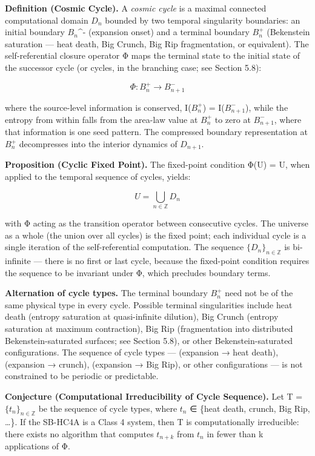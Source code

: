 \documentclass[
]{article}
\begin{document}
\textbf{Definition (Cosmic Cycle).} A \emph{cosmic cycle} is a maximal
connected computational domain \(D_{n}\) bounded by two temporal
singularity boundaries: an initial boundary \(B_{n}\)\^{}- (expansion
onset) and a terminal boundary \(B_n^+\) (Bekenstein saturation --- heat
death, Big Crunch, Big Rip fragmentation, or equivalent). The
self-referential closure operator Φ maps the terminal state to the
initial state of the successor cycle (or cycles, in the branching case;
see Section 5.8):

\[\Phi: B_n^+ \to B_{n+1}^-\]

where the source-level information is conserved, I(\(B_n^+\)) =
I(\(B_{n+1}^-\)), while the entropy from within falls from the area-law
value at \(B_n^+\) to zero at \(B_{n+1}^-\), where that information is
one seed pattern. The compressed boundary representation at \(B_n^+\)
decompresses into the interior dynamics of \(D_{n+1}\).

\textbf{Proposition (Cyclic Fixed Point).} The fixed-point condition
Φ(U) = U, when applied to the temporal sequence of cycles, yields:

\[U = \bigcup_{n \in \mathbb{Z}} D_n\]

with Φ acting as the transition operator between consecutive cycles. The
universe as a whole (the union over all cycles) is the fixed point; each
individual cycle is a single iteration of the self-referential
computation. The sequence \(\{D_n\}_{n \in \mathbb{Z}}\) is bi-infinite
--- there is no first or last cycle, because the fixed-point condition
requires the sequence to be invariant under Φ, which precludes boundary
terms.

\textbf{Alternation of cycle types.} The terminal boundary \(B_n^+\)
need not be of the same physical type in every cycle. Possible terminal
singularities include heat death (entropy saturation at quasi-infinite
dilution), Big Crunch (entropy saturation at maximum contraction), Big
Rip (fragmentation into distributed Bekenstein-saturated surfaces; see
Section 5.8), or other Bekenstein-saturated configurations. The sequence
of cycle types --- (expansion → heat death), (expansion → crunch),
(expansion → Big Rip), or other configurations --- is not constrained to
be periodic or predictable.

\textbf{Conjecture (Computational Irreducibility of Cycle Sequence).}
Let T = \(\{t_n\}_{n \in \mathbb{Z}}\) be the sequence of cycle types,
where \(t_{n}\) ∈ \{heat death, crunch, Big Rip, \ldots\}. If the
SB-HC4A is a Class 4 system, then T is computationally irreducible:
there exists no algorithm that computes \(t_{n+k}\) from \(t_{n}\) in
fewer than k applications of Φ.
\end{document}
